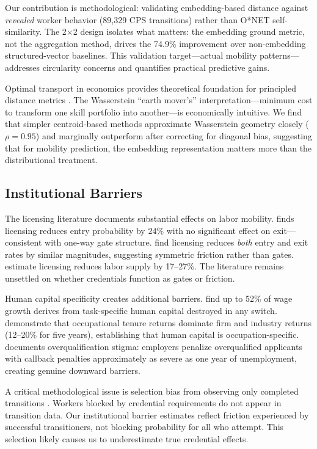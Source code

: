 \documentclass[12pt]{article}
\begin{document}
Our contribution is methodological: validating embedding-based distance against \emph{revealed} worker behavior (89,329 CPS transitions) rather than O*NET self-similarity. The 2$\times$2 design isolates what matters: the embedding ground metric, not the aggregation method, drives the 74.9\% improvement over non-embedding structured-vector baselines. This validation target---actual mobility patterns---addresses circularity concerns and quantifies practical predictive gains.

Optimal transport in economics provides theoretical foundation for principled distance metrics \citep{Galichon2016}. The Wasserstein ``earth mover's'' interpretation---minimum cost to transform one skill portfolio into another---is economically intuitive. We find that simpler centroid-based methods approximate Wasserstein geometry closely ($\rho = 0.95$) and marginally outperform after correcting for diagonal bias, suggesting that for mobility prediction, the embedding representation matters more than the distributional treatment.


\subsection{Institutional Barriers}
\label{subsec:lit-institutional}


The licensing literature documents substantial effects on labor mobility. \citet{Jackson2023} finds licensing reduces entry probability by 24\% with no significant effect on exit---consistent with one-way gate structure. \citet{KleinerXu2020} find licensing reduces \emph{both} entry and exit rates by similar magnitudes, suggesting symmetric friction rather than gates. \citet{BlairChung2019} estimate licensing reduces labor supply by 17--27\%. The literature remains unsettled on whether credentials function as gates or friction.

Human capital specificity creates additional barriers. \citet{GathmannSchonberg2010} find up to 52\% of wage growth derives from task-specific human capital destroyed in any switch. \citet{KambourovManovskii2009} demonstrate that occupational tenure returns dominate firm and industry returns (12--20\% for five years), establishing that human capital is occupation-specific. \citet{Pedulla2016} documents overqualification stigma: employers penalize overqualified applicants with callback penalties approximately as severe as one year of unemployment, creating genuine downward barriers.

A critical methodological issue is selection bias from observing only completed transitions \citep{Heckman1979}. Workers blocked by credential requirements do not appear in transition data. Our institutional barrier estimates reflect friction experienced by successful transitioners, not blocking probability for all who attempt. This selection likely causes us to underestimate true credential effects.
\end{document}
